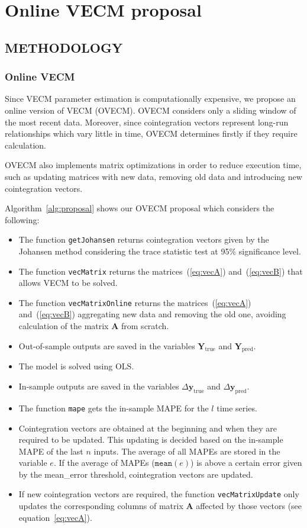 
\chapter{Online VECM proposal}
\section{\uppercase{Methodology}}
\label{sec:methodology}
\noindent 
\subsection{Online VECM} \label{sec:proposal}

Since VECM parameter estimation is computationally expensive, we propose an
online version of VECM (OVECM).  OVECM considers only a sliding window of the
most recent data. Moreover, since cointegration vectors represent long-run
relationships which vary little in time, OVECM determines firstly if they require calculation. 

OVECM also implements matrix optimizations in order to reduce execution time,
such as updating matrices with new data, removing old data and introducing new
cointegration vectors.

Algorithm~\ref{alg:proposal} shows our OVECM proposal which considers the
following:

\begin{itemize}
\item The function \texttt{getJohansen} returns cointegration vectors given by
the Johansen method considering the trace statistic test at 95\%
significance level.
\item The function \texttt{vecMatrix} returns the matrices~(\ref{eq:vecA})
and~(\ref{eq:vecB}) that allows VECM to be solved.
\item The function \texttt{vecMatrixOnline} returns the
matrices~(\ref{eq:vecA}) and~(\ref{eq:vecB}) aggregating new data and removing
the old one, avoiding calculation of the matrix $\mathbf{A}$ from scratch.
\item Out-of-sample outputs are saved in the variables 
$\mathbf{Y}_{\text{true}}$ and $\mathbf{Y}_{\text{pred}}$.
\item The model is solved using OLS.
\item In-sample outputs are saved in the variables $\Delta
\mathbf{y}_{\text{true}}$ and $\Delta \mathbf{y}_{\text{pred}}$.
\item The function \texttt{mape} gets the in-sample MAPE for the $l$ time
series.
\item Cointegration vectors are obtained at the beginning and when they are required to be updated. This updating is decided based on the in-sample MAPE of the last $n$ inputs. The average of all
MAPEs are stored in the variable $e$. If the average of MAPEs
($\texttt{mean}(e)$) is above a certain error given by the mean\_error threshold, cointegration vectors are updated.
\item If new cointegration vectors are required, the function
\texttt{vecMatrixUpdate} only updates the corresponding columns of matrix
$\mathbf{A}$ affected by those vectors (see equation~\ref{eq:vecA}).
\end{itemize}

